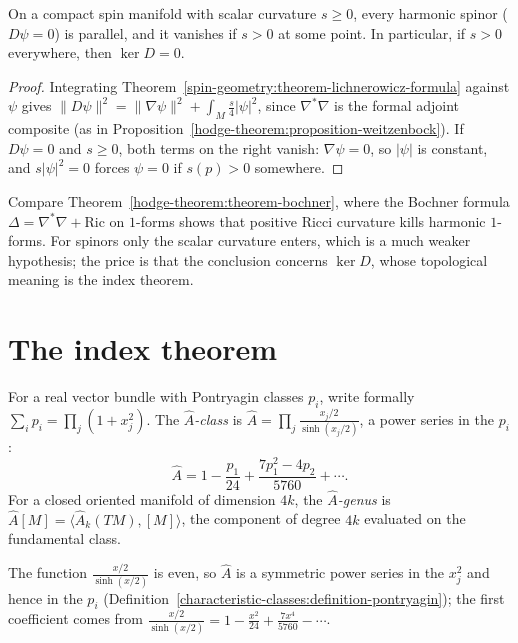 \begin{theorem}[Lichnerowicz]\label{spin-geometry:theorem-lichnerowicz-vanishing}
On a compact spin manifold with scalar curvature $s \geq 0$, every harmonic spinor ($D\psi = 0$) is parallel, and it vanishes if $s > 0$ at some point. In particular, if $s > 0$ everywhere, then $\ker D = 0$.
\end{theorem}

\begin{proof}
Integrating Theorem~\ref{spin-geometry:theorem-lichnerowicz-formula} against $\psi$ gives $\|D\psi\|^2 = \|\nabla\psi\|^2 + \int_M\frac{s}{4}|\psi|^2$, since $\nabla^*\nabla$ is the formal adjoint composite (as in
Proposition~\ref{hodge-theorem:proposition-weitzenbock}). If $D\psi = 0$ and $s \geq 0$, both terms on the right vanish: $\nabla\psi = 0$, so $|\psi|$ is constant, and $s|\psi|^2 = 0$ forces $\psi = 0$ if $s(p) > 0$ somewhere.
\end{proof}

Compare Theorem~\ref{hodge-theorem:theorem-bochner}, where the Bochner formula $\Delta = \nabla^*\nabla + \mathrm{Ric}$ on $1$-forms shows that positive Ricci curvature kills harmonic $1$-forms. For spinors only the scalar
curvature enters, which is a much weaker hypothesis; the price is that the conclusion concerns $\ker D$, whose topological meaning is the index theorem.

\section{The index theorem}\label{spin-geometry:section-index-theorem}

\begin{definition}\label{spin-geometry:definition-a-hat}
For a real vector bundle with Pontryagin classes $p_i$, write formally $\sum_ip_i = \prod_j(1 + x_j^2)$. The \emph{$\hat{A}$-class} is $\hat{A} = \prod_j\frac{x_j/2}{\sinh(x_j/2)}$, a power series in the $p_i$:
\[
\hat{A} = 1 - \frac{p_1}{24} + \frac{7p_1^2 - 4p_2}{5760} + \cdots.
\]
For a closed oriented manifold of dimension $4k$, the \emph{$\hat{A}$-genus} is $\hat{A}[M] = \langle\hat{A}_k(TM), [M]\rangle$, the component of degree $4k$ evaluated on the fundamental class.
\end{definition}

The function $\frac{x/2}{\sinh(x/2)}$ is even, so $\hat{A}$ is a symmetric power series in the $x_j^2$ and hence in the $p_i$ (Definition~\ref{characteristic-classes:definition-pontryagin}); the first coefficient comes from
$\frac{x/2}{\sinh(x/2)} = 1 - \frac{x^2}{24} + \frac{7x^4}{5760} - \cdots$.

